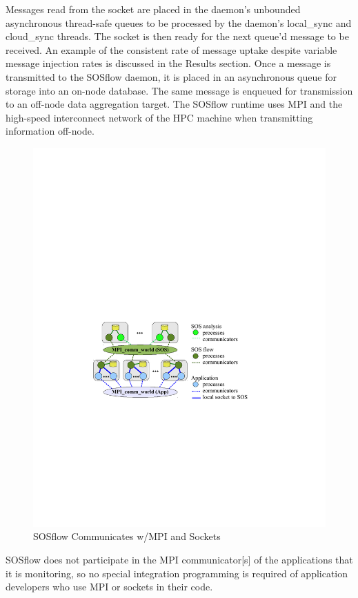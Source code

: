 %
Messages read from the socket are placed in the daemon's
unbounded asynchronous thread-safe queues to be processed by the
daemon's local\_sync and cloud\_sync threads.
%
The socket is then ready for the next queue'd message to
be received. 
%
An example of the consistent rate of message uptake
despite variable message injection rates is discussed in the Results
section.
%
Once a message is transmitted to the SOSflow daemon, it is placed in
an asynchronous queue for storage into an on-node database.
%
The same message is enqueued for transmission to an off-node data
aggregation target.
%
The SOSflow runtime uses MPI and the high-speed interconnect network
of the HPC machine when transmitting information off-node.
\begin{figure}[h]
  \centering
  \includegraphics[width=\columnwidth]{images/sos-mpmd.pdf}
  \caption{SOSflow Communicates w/MPI and Sockets}
  \label{fig_sos_mpmd}
\end{figure}
%
SOSflow does not participate in the MPI communicator[s] of the
applications that it is monitoring, so no special integration
programming is required of application developers who use MPI or
sockets in their code.
%
\par
%
%

